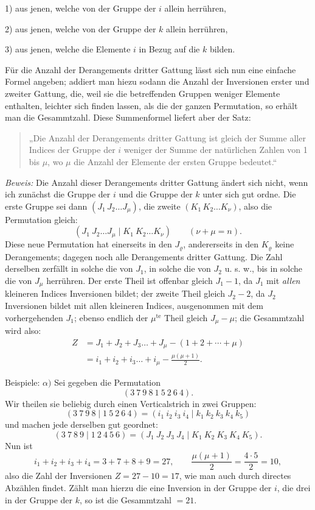 \documentclass[10pt]{article}
\begin{document}
1) aus jenen, welche von der Gruppe der \(i\) allein herrühren,

2) aus jenen, welche von der Gruppe der \(k\) allein herrühren,

3) aus jenen, welche die Elemente \(i\) in Bezug auf die \(k\) bilden.

Für die Anzahl der Derangements dritter Gattung lässt sich nun eine einfache Formel angeben; addiert man hiezu sodann die Anzahl der Inversionen erster und zweiter Gattung, die, weil sie die betreffenden Gruppen weniger Elemente enthalten, leichter sich finden lassen, als die der ganzen Permutation, so erhält man die Gesammtzahl. Diese Summenformel liefert aber der Satz:
\begin{quote}
„Die Anzahl der Derangements dritter Gattung ist gleich der Summe aller Indices der Gruppe der \(i\) weniger der Summe der natürlichen Zahlen von 1 bis \(\mu\), wo \(\mu\) die Anzahl der Elemente der ersten Gruppe bedeutet.“
\end{quote}

\emph{Beweis:} Die Anzahl dieser Derangements dritter Gattung ändert sich nicht, wenn ich zunächst die Gruppe der \(i\) und die Gruppe der \(k\) unter sich gut ordne. Die erste Gruppe sei dann \((J_1\,J_2\ldots J_\mu)\), die zweite \((K_1\,K_2\ldots K_\nu)\), also die Permutation gleich:
\[
(J_1\ J_2\ldots J_\mu\mid K_1\ K_2\ldots K_\nu)\qquad(\nu+\mu=n).
\]
Diese neue Permutation hat einerseits in den \(J_\varrho\), andererseits in den \(K_\varrho\) keine Derangements; dagegen noch alle Derangements dritter Gattung. Die Zahl derselben zerfällt in solche die von \(J_1\), in solche die von \(J_2\) u. s. w., bis in solche die von \(J_\mu\) herrühren. Der erste Theil ist offenbar gleich \(J_1-1\), da \(J_1\) mit \emph{allen} kleineren Indices Inversionen bildet; der zweite Theil gleich \(J_2-2\), da \(J_2\) Inversionen bildet mit allen kleineren Indices, ausgenommen mit dem vorhergehenden \(J_1\); ebenso endlich der \(\mu^{\mathrm{te}}\) Theil gleich \(J_\mu-\mu\); die Gesammtzahl wird also:
\[
\begin{aligned}
Z&=J_1+J_2+J_3\ldots+J_\mu-(1+2+\cdots+\mu)\\
&=i_1+i_2+i_3\ldots+i_\mu-\frac{\mu(\mu+1)}{2}.
\end{aligned}
\]

Beispiele: \(\alpha)\) Sei gegeben die Permutation
\[
(3\ 7\ 9\ 8\ 1\ 5\ 2\ 6\ 4).
\]
Wir theilen sie beliebig durch einen Verticalstrich in zwei Gruppen:
\[
(3\ 7\ 9\ 8\mid1\ 5\ 2\ 6\ 4)=(i_1\ i_2\ i_3\ i_4\mid k_1\ k_2\ k_3\ k_4\ k_5)
\]
und machen jede derselben gut geordnet:
\[
(3\ 7\ 8\ 9\mid1\ 2\ 4\ 5\ 6)=(J_1\ J_2\ J_3\ J_4\mid K_1\ K_2\ K_3\ K_4\ K_5).
\]
Nun ist
\[
i_1+i_2+i_3+i_4=3+7+8+9=27,\qquad
\frac{\mu(\mu+1)}{2}=\frac{4\cdot5}{2}=10,
\]
also die Zahl der Inversionen \(Z=27-10=17\), wie man auch durch directes Abzählen findet. Zählt man hierzu die eine Inversion in der Gruppe der \(i\), die drei in der Gruppe der \(k\), so ist die Gesammtzahl \(=21\).
\end{document}

